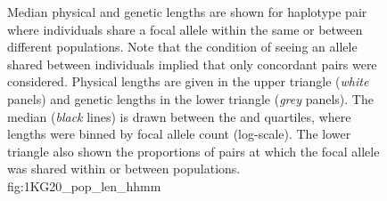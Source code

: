 

\begin{figure}[p]
\centering
{}
%
{Median physical and genetic lengths are shown for haplotype pair where individuals share a focal allele within the same or between different populations.
Note that the condition of seeing an allele shared between individuals implied that only concordant pairs were considered.
Physical lengths are given in the upper triangle (\emph{white} panels) and genetic lengths in the lower triangle (\emph{grey} panels).
The median (\emph{black} lines) is drawn between the  and  quartiles, where lengths were binned by focal allele count (log-scale).
The lower triangle also shown the proportions of pairs at which the focal allele was shared within or between populations.}%
{fig:1KG20_pop_len_hhmm}
\end{figure}
